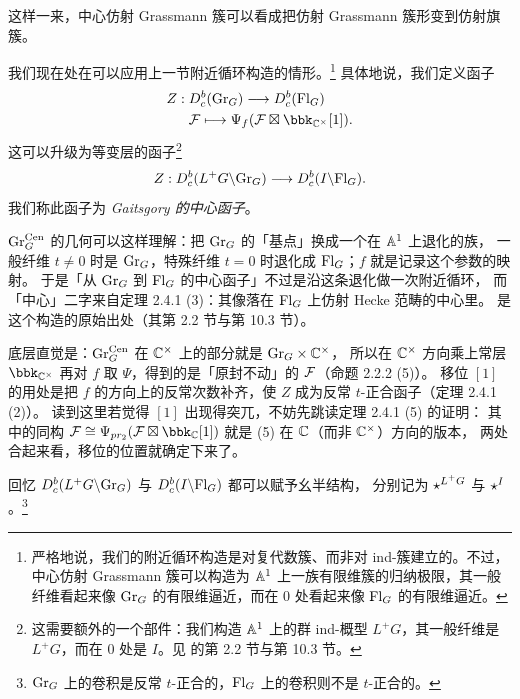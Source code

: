 这样一来，中心仿射 Grassmann 簇可以看成把仿射 Grassmann 簇形变到仿射旗簇。

我们现在处在可以应用上一节附近循环构造的情形。\footnote{严格地说，我们的附近循环构造是对复代数簇、而非对 ind-簇建立的。不过，中心仿射 Grassmann 簇可以构造为 $\mathbb{A}^1$ 上一族有限维簇的归纳极限，其一般纤维看起来像 $\mathrm{Gr}_G$ 的有限维逼近，而在 $0$ 处看起来像 $\mathrm{Fl}_G$ 的有限维逼近。}
具体地说，我们定义函子
\begin{align*}
Z:\;&D^b_c(\Gr_G)\longrightarrow D^b_c(\Fl_G)\\
&\cF\longmapsto \Psi_f(\cF\boxtimes\bbk_{\bbC^{\times}}[1]).
\end{align*}
这可以升级为等变层的函子\footnote{这需要额外的一个部件：我们构造 $\mathbb{A}^1$ 上的群 ind-概型 $L^+G$，其一般纤维是 $L^+G$，而在 $0$ 处是 $I$。见 \cite{AcRi} 的第 2.2 节与第 10.3 节。}
\[
Z:D^b_c(L^+G\backslash\mathrm{Gr}_G)\longrightarrow D^b_c(I\backslash\mathrm{Fl}_G).
\]
我们称此函子为 \emph{Gaitsgory 的中心函子}。

\begin{yizhu}
$\mathrm{Gr}_G^{\mathrm{Cen}}$ 的几何可以这样理解：把 $\mathrm{Gr}_G$ 的「基点」换成一个在 $\mathbb{A}^1$ 上退化的族，
一般纤维 $t\neq0$ 时是 $\mathrm{Gr}_G$，特殊纤维 $t=0$ 时退化成 $\mathrm{Fl}_G$；$f$ 就是记录这个参数的映射。
于是「从 $\mathrm{Gr}_G$ 到 $\mathrm{Fl}_G$ 的中心函子」不过是沿这条退化做一次附近循环，
而「中心」二字来自定理 2.4.1 (3)：其像落在 $\mathrm{Fl}_G$ 上仿射 Hecke 范畴的中心里。
\cite{AcRi} 是这个构造的原始出处（其第 2.2 节与第 10.3 节）。
\end{yizhu}

\begin{yizhu}
底层直觉是：$\mathrm{Gr}_G^{\mathrm{Cen}}$ 在 $\mathbb{C}^{\times}$ 上的部分就是 $\mathrm{Gr}_G\times\mathbb{C}^{\times}$，
所以在 $\mathbb{C}^{\times}$ 方向乘上常层 $\bbk_{\bbC^{\times}}$ 再对 $f$ 取 $\Psi$，得到的是「原封不动」的 $\mathcal{F}$（命题 2.2.2 (5)）。
移位 $[1]$ 的用处是把 $f$ 的方向上的反常次数补齐，使 $Z$ 成为反常 $t$-正合函子（定理 2.4.1 (2)）。
读到这里若觉得 $[1]$ 出现得突兀，不妨先跳读定理 2.4.1 (5) 的证明：
其中的同构 $\cF\cong\Psi_{pr_2}(\cF\boxtimes\bbk_{\bbC}[1])$ 就是 (5) 在 $\mathbb{C}$（而非 $\mathbb{C}^{\times}$）方向的版本，
两处合起来看，移位的位置就确定下来了。
\end{yizhu}

回忆 $D^b_c(L^+G\backslash\mathrm{Gr}_G)$ 与 $D^b_c(I\backslash\mathrm{Fl}_G)$ 都可以赋予幺半结构，
分别记为 $\star^{L^+G}$ 与 $\star^{I}$。\footnote{$\mathrm{Gr}_G$ 上的卷积是反常 $t$-正合的，$\mathrm{Fl}_G$ 上的卷积则不是 $t$-正合的。}

